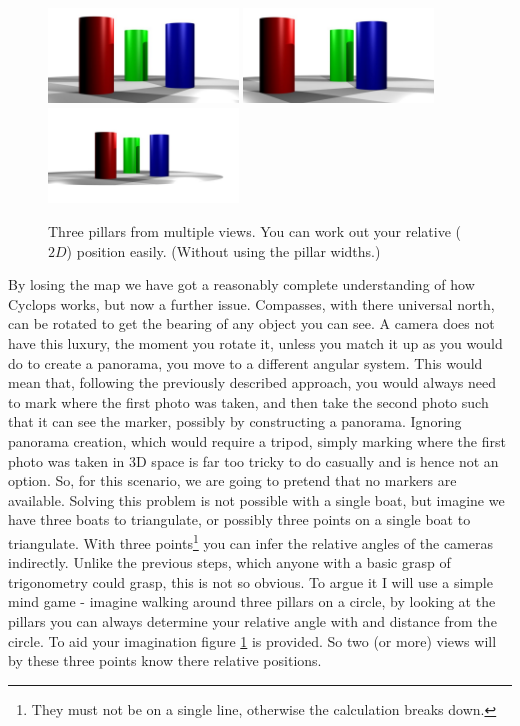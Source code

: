 \documentclass[10pt,a4paper,twoside]{article}
\begin{document}
\begin{figure}[t]
 \centering
 \includegraphics[width=0.45\textwidth]{diags/pillars_base} \includegraphics[width=0.45\textwidth]{diags/pillars_rotate}
 \includegraphics[width=0.45\textwidth]{diags/pillars_zoom}
 \caption{Three pillars from multiple views. You can work out your relative ($2D$) position easily. (Without using the pillar widths.)}
 \label{fig:pillars}
\end{figure}

By losing the map we have got a reasonably complete understanding of how Cyclops works, but now a further issue.
Compasses, with there universal north, can be rotated to get the bearing of any object you can see.
A camera does not have this luxury, the moment you rotate it, unless you match it up as you would do to create a panorama, you move to a different angular system.
This would mean that, following the previously described approach, you would always need to mark where the first photo was taken, and then take the second photo such that it can see the marker, possibly by constructing a panorama.
Ignoring panorama creation, which would require a tripod, simply marking where the first photo was taken in 3D space is far too tricky to do casually and is hence not an option.
So, for this scenario, we are going to pretend that no markers are available.
Solving this problem is not possible with a single boat, but imagine we have three boats to triangulate, or possibly three points on a single boat to triangulate.
With three points\footnote{They must not be on a single line, otherwise the calculation breaks down.} you can infer the relative angles of the cameras indirectly.
Unlike the previous steps, which anyone with a basic grasp of trigonometry could grasp, this is not so obvious.
To argue it I will use a simple mind game - imagine walking around three pillars on a circle, by looking at the pillars you can always determine your relative angle with and distance from the circle.
To aid your imagination figure \ref{fig:pillars} is provided.
So two (or more) views will by these three points know there relative positions.
\end{document}
